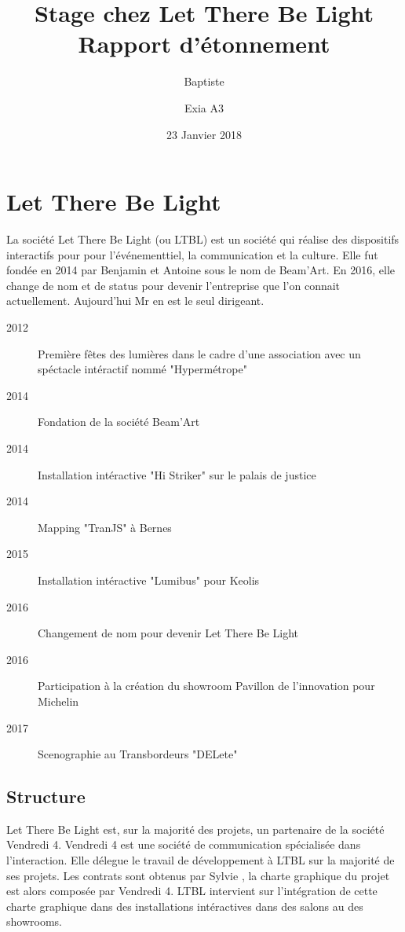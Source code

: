 \documentclass{article}
\title{Stage chez Let There Be Light \\ \large Rapport d'étonnement}
\date{23 Janvier 2018}
\author{Baptiste \bsc{Saclier} \and Exia A3}
\begin{document}
\maketitle

\vspace{3cm}

\tableofcontents

\clearpage

\section{Let There Be Light}

La société Let There Be Light (ou LTBL) est un société qui réalise des dispositifs interactifs pour pour l'événementtiel, la communication et la culture.
Elle fut fondée en 2014 par Benjamin  et Antoine  sous le nom de Beam'Art.
En 2016, elle change de nom et de status pour devenir l'entreprise que l'on connait actuellement.
Aujourd'hui Mr  en est le seul dirigeant.

\begin{description}
    \item[2012] Première fêtes des lumières dans le cadre d'une association avec un spéctacle intéractif nommé "Hypermétrope"
    \item[2014] Fondation de la société Beam'Art
    \item[2014] Installation intéractive "Hi Striker" sur le palais de justice
    \item[2014] Mapping "TranJS" à Bernes
    \item[2015] Installation intéractive "Lumibus" pour Keolis
    \item[2016] Changement de nom pour devenir Let There Be Light
    \item[2016] Participation à la création du showroom Pavillon de l'innovation pour Michelin
    \item[2017] Scenographie au Transbordeurs "DELete"
\end{description}

\subsection{Structure}

Let There Be Light est, sur la majorité des projets, un partenaire de la société Vendredi 4.
Vendredi 4 est une société de communication spécialisée dans l'interaction.
Elle délegue le travail de développement à LTBL sur la majorité de ses projets.
Les contrats sont obtenus par Sylvie , la charte graphique du projet est alors composée par Vendredi 4.
LTBL intervient sur l'intégration de cette charte graphique dans des installations intéractives dans des salons au des showrooms.
\end{document}

